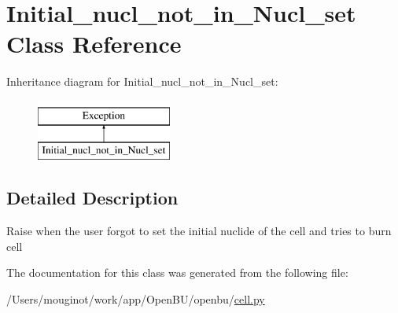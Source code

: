 \hypertarget{classopenbu_1_1cell_1_1_initial__nucl__not__in___nucl__set}{}\section{Initial\+\_\+nucl\+\_\+not\+\_\+in\+\_\+\+Nucl\+\_\+set Class Reference}
\label{classopenbu_1_1cell_1_1_initial__nucl__not__in___nucl__set}
Inheritance diagram for Initial\+\_\+nucl\+\_\+not\+\_\+in\+\_\+\+Nucl\+\_\+set\+:\begin{figure}[H]
\begin{center}
\leavevmode
\includegraphics[height=2.000000cm]{classopenbu_1_1cell_1_1_initial__nucl__not__in___nucl__set}
\end{center}
\end{figure}


\subsection{Detailed Description}
\begin{DoxyVerb}Raise when the user forgot to set the initial nuclide of the cell and tries to burn cell\end{DoxyVerb}
 

The documentation for this class was generated from the following file\+:\begin{DoxyCompactItemize}
\item 
/\+Users/mouginot/work/app/\+Open\+B\+U/openbu/\mbox{\hyperlink{cell_8py}{cell.\+py}}\end{DoxyCompactItemize}
